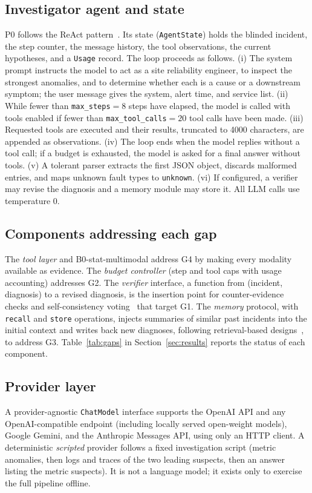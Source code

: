 \documentclass[conference]{IEEEtran}
\begin{document}
\subsection{Investigator agent and state}
P0 follows the ReAct pattern~\cite{yao2023react}. Its state (\texttt{AgentState}) holds the blinded incident, the step counter, the message history, the tool observations, the current hypotheses, and a \texttt{Usage} record. The loop proceeds as follows. (i) The system prompt instructs the model to act as a site reliability engineer, to inspect the strongest anomalies, and to determine whether each is a cause or a downstream symptom; the user message gives the system, alert time, and service list. (ii) While fewer than \texttt{max\_steps}${}=8$ steps have elapsed, the model is called with tools enabled if fewer than \texttt{max\_tool\_calls}${}=20$ tool calls have been made. (iii) Requested tools are executed and their results, truncated to 4000 characters, are appended as observations. (iv) The loop ends when the model replies without a tool call; if a budget is exhausted, the model is asked for a final answer without tools. (v) A tolerant parser extracts the first JSON object, discards malformed entries, and maps unknown fault types to \texttt{unknown}. (vi) If configured, a verifier may revise the diagnosis and a memory module may store it. All LLM calls use temperature 0.

\subsection{Components addressing each gap}
The \emph{tool layer} and B0-stat-multimodal address G4 by making every modality available as evidence. The \emph{budget controller} (step and tool caps with usage accounting) addresses G2. The \emph{verifier} interface, a function from (incident, diagnosis) to a revised diagnosis, is the insertion point for counter-evidence checks and self-consistency voting~\cite{wang2023selfconsistency,madaan2023selfrefine} that target G1. The \emph{memory} protocol, with \texttt{recall} and \texttt{store} operations, injects summaries of similar past incidents into the initial context and writes back new diagnoses, following retrieval-based designs~\cite{chen2024rcacopilot,park2023generative}, to address G3. Table~\ref{tab:gaps} in Section~\ref{sec:results} reports the status of each component.

\subsection{Provider layer}
A provider-agnostic \texttt{ChatModel} interface supports the OpenAI API and any OpenAI-compatible endpoint (including locally served open-weight models), Google Gemini, and the Anthropic Messages API, using only an HTTP client. A deterministic \emph{scripted} provider follows a fixed investigation script (metric anomalies, then logs and traces of the two leading suspects, then an answer listing the metric suspects). It is not a language model; it exists only to exercise the full pipeline offline.
\end{document}
